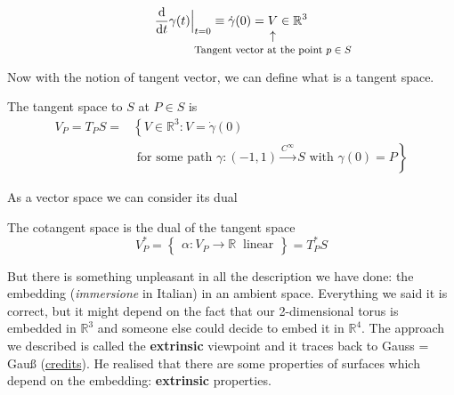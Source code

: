 \documentclass[../main.tex]{subfiles}
\begin{document}
\[
\dv{t}\gamma(t)\Bigr|_{\substack{t=0}}\equiv\Dot{\gamma}(0)=\underset{\mathclap{\tikz \node {$\uparrow$} node [below=1ex] {\footnotesize Tangent vector at the point $p\in S$};}}{V}\in\mathbb{R}^3
\]
Now with the notion of tangent vector, we can define what is a tangent space.
\begin{definition}
The tangent space to $S$ at $P\in S$ is
\begin{align*}
V_P=T_P S=&\left\{V\in \mathbb{R}^3: V=\Dot{\gamma}(0)\right.\\ 
&\left.\textrm{ for some path } \gamma: (-1,1)\xrightarrow{C^\infty} S \mbox{ with } \gamma(0)=P\right\}
\end{align*}
\end{definition}
As a vector space we can consider its dual
\begin{definition}
The cotangent space is the dual of the tangent space
\[
V_P^*=\begin{Bmatrix}\alpha:V_P \rightarrow \mathbb{R} \ \mbox{ linear}\end{Bmatrix}=T_P^* S
\]
\end{definition}
But there is something unpleasant in all the description we have done: the embedding (\textit{immersione} in Italian) in an ambient space. Everything we said it is correct, but it might depend on the fact that our 2-dimensional torus is embedded in $\mathbb{R}^3$ and someone else could decide to embed it in $\mathbb{R}^4$. The approach we described is called the \textbf{extrinsic} viewpoint and it traces back to Gauss = Gauß (\underline{credits}). He realised that there are some properties of surfaces which depend on the embedding: \textbf{extrinsic} properties.
\end{document}
